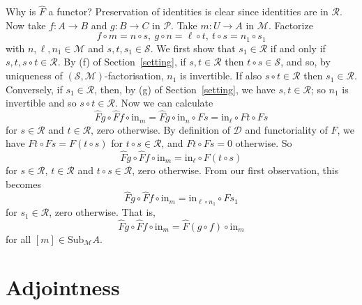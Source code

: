 \documentclass[a4paper,12pt,reqno]{amsart}
\theoremstyle{definition}
\theoremstyle{fact}
\theoremstyle{genquest}
\theoremstyle{step}
\newcommand{\ra}{\rightarrow}
\def\CD{{\mathscr D}}
\def\CM{{\mathscr M}}
\def\CP{{\mathscr P}}
\def\CR{{\mathscr R}}
\def\CS{{\mathscr S}}
\begin{document}
Why is $\widehat{F}$ a functor? Preservation of identities is clear since identities are in $\CR$.
Now take $f:A\ra B$ and $g:B\ra C$ in $\CP$. Take $m:U\ra A$ in $\CM$. Factorize 
$$f\circ m = n\circ s, \ g\circ n = \ell \circ t, \ t\circ s = n_1\circ s_1$$ 
with $n, \ell, n_1 \in \CM$ and $s, t, s_1\in \CS$. 
We first show that $s_1\in \CR$ if and only if $s, t, s\circ t \in \CR$.
By (f) of Section~\ref{setting}, if $s, t \in \CR$ then $t\circ s\in \CS$,
and so, by uniqueness of $(\CS ,\CM)$-factorisation, $n_1$ is invertible.
If also $s\circ t \in \CR$ then $s_1 \in \CR$. Conversely, if $s_1 \in \CR$,
then, by (g) of Section~\ref{setting}, we have $s, t \in \CR$; so
$n_1$ is invertible and so $s\circ t \in \CR$.       
Now we can calculate 
$$\widehat{F}g\circ \widehat{F}f \circ \mathrm{in}_m 
= \widehat{F}g\circ \mathrm{in}_n \circ Fs
= \mathrm{in}_{\ell} \circ Ft\circ Fs$$      
for $s\in \CR$ and $t\in \CR$, zero otherwise.
By definition of $\CD$ and functoriality of $F$, we have $Ft\circ Fs = F(t\circ s)$
for $t\circ s \in \CR$, and $Ft\circ Fs = 0$ otherwise. So
$$\widehat{F}g\circ \widehat{F}f \circ \mathrm{in}_m 
= \mathrm{in}_{\ell} \circ F(t\circ s)$$
for $s\in \CR$, $t\in \CR$ and $t\circ s \in \CR$, zero otherwise. 
From our first observation, this becomes
$$\widehat{F}g\circ \widehat{F}f \circ \mathrm{in}_m 
= \mathrm{in}_{\ell \circ n_1} \circ Fs_1$$
for $s_1 \in \CR$, zero otherwise. That is, 
$$\widehat{F}g\circ \widehat{F}f \circ \mathrm{in}_m 
= \widehat{F}(g\circ f) \circ \mathrm{in}_m$$
for all $[m]\in \mathrm{Sub}_{\CM}A$.

\section{Adjointness}\label{adjointness}
\end{document}
